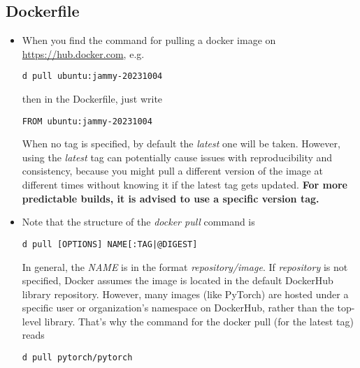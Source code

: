 \documentclass[12pt, a4paper]{article}
\numberwithin{equation}{section}
\theoremstyle{definition}
\theoremstyle{definition}
\begin{document}
	\subsection{Dockerfile}
	
	\begin{itemize}
		\item When you find the command for pulling a docker image on \url{https://hub.docker.com}, e.g.~
		
		\begin{lstlisting}[style=mystylebash, label=alg:dockerhub, xleftmargin=\parindent]
			d pull ubuntu:jammy-20231004
		\end{lstlisting}
		
		then in the Dockerfile, just write 
		
		\begin{lstlisting}[style=mystylebash, label=alg:dockerfile_from, xleftmargin=\parindent]
			FROM ubuntu:jammy-20231004
		\end{lstlisting}
		
		When no tag is specified, by default the \textit{latest} one will be taken. However, using the \textit{latest} tag can potentially cause issues with reproducibility and consistency, because you might pull a different version of the image at different times without knowing it if the latest tag gets updated. \textbf{For more predictable builds, it is advised to use a specific version tag.}
		
		\item Note that the structure of the \textit{docker pull} command is
		
		\begin{lstlisting}[style=mystylebash, label=alg:docker_pull, xleftmargin=\parindent]
			d pull [OPTIONS] NAME[:TAG|@DIGEST]
		\end{lstlisting}
		
		In general, the \textit{NAME} is in the format \textit{repository/image}. If \textit{repository} is not specified, Docker assumes the image is located in the default DockerHub library repository. However, many images (like PyTorch) are hosted under a specific user or organization's namespace on DockerHub, rather than the top-level library. That's why the command for the docker pull (for the latest tag) reads 
		
		\begin{lstlisting}[style=mystylebash, label=alg:docker_pull_exmp, xleftmargin=\parindent]
			d pull pytorch/pytorch
		\end{lstlisting}
		

\end{itemize}
\end{document}
